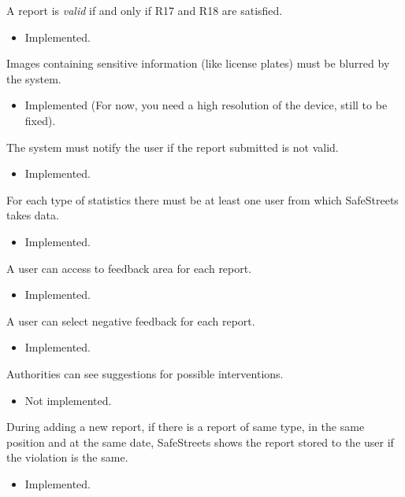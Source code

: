 \documentclass[../ITD.tex]{subfiles}
\begin{document}
\begin{enumerate}
         A report is \textit{valid} if and only if R17 and R18 are satisfied.
        \begin{itemize}
            \item Implemented.
        \end{itemize}

         Images containing sensitive information (like license plates) must be blurred by the system.
        \begin{itemize}
            \item Implemented (For now, you need a high resolution of the device, still to be fixed).
        \end{itemize}

         The system must notify the user if the report submitted is not valid.
        \begin{itemize}
            \item Implemented.
        \end{itemize}

         For each type of statistics there must be at least one user from which SafeStreets takes data.
        \begin{itemize}
            \item Implemented.
        \end{itemize}

         A user can access to feedback area for each report.
        \begin{itemize}
            \item Implemented.
        \end{itemize}

         A user can select negative feedback for each report.
        \begin{itemize}
            \item Implemented.
        \end{itemize}

         Authorities can see suggestions for possible interventions.
        \begin{itemize}
            \item Not implemented.
        \end{itemize}

         During adding a new report, if there is a report of same type, in the same position and at the same date,
        SafeStreets shows the report stored to the user if the violation is the same.
        \begin{itemize}
            \item Implemented.
        \end{itemize}


\end{enumerate}
\end{document}
